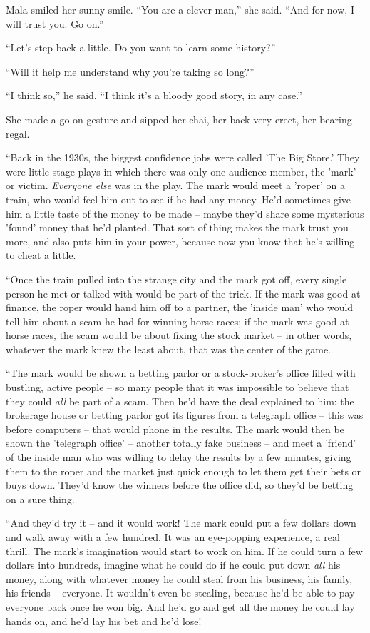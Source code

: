 Mala smiled her sunny smile. ``You are a clever man,'' she said. ``And
for now, I will trust you. Go on.''

``Let's step back a little. Do you want to learn some history?''

``Will it help me understand why you're taking so long?''

``I think so,'' he said. ``I think it's a bloody good story, in any
case.''

She made a go-on gesture and sipped her chai, her back very erect,
her bearing regal.

``Back in the 1930s, the biggest confidence jobs were called 'The
Big Store.' They were little stage plays in which there was only
one audience-member, the 'mark' or victim. \emph{Everyone else} was
in the play. The mark would meet a 'roper' on a train, who would
feel him out to see if he had any money. He'd sometimes give him a
little taste of the money to be made -- maybe they'd share some
mysterious 'found' money that he'd planted. That sort of thing
makes the mark trust you more, and also puts him in your power,
because now you know that he's willing to cheat a little.

``Once the train pulled into the strange city and the mark got off,
every single person he met or talked with would be part of the
trick. If the mark was good at finance, the roper would hand him
off to a partner, the 'inside man' who would tell him about a scam
he had for winning horse races; if the mark was good at horse
races, the scam would be about fixing the stock market -- in other
words, whatever the mark knew the least about, that was the center
of the game.

``The mark would be shown a betting parlor or a stock-broker's
office filled with bustling, active people -- so many people that
it was impossible to believe that they could \emph{all} be part of
a scam. Then he'd have the deal explained to him: the brokerage
house or betting parlor got its figures from a telegraph office --
this was before computers -- that would phone in the results. The
mark would then be shown the 'telegraph office' -- another totally
fake business -- and meet a 'friend' of the inside man who was
willing to delay the results by a few minutes, giving them to the
roper and the market just quick enough to let them get their bets
or buys down. They'd know the winners before the office did, so
they'd be betting on a sure thing.

``And they'd try it -- and it would work! The mark could put a few
dollars down and walk away with a few hundred. It was an
eye-popping experience, a real thrill. The mark's imagination would
start to work on him. If he could turn a few dollars into hundreds,
imagine what he could do if he could put down \emph{all} his money,
along with whatever money he could steal from his business, his
family, his friends -- everyone. It wouldn't even be stealing,
because he'd be able to pay everyone back once he won big. And he'd
go and get all the money he could lay hands on, and he'd lay his
bet and he'd lose!

